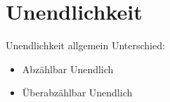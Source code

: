 
\section{Unendlichkeit}


%






\begin{frame}[c]{Unendlichkeit allgemein}
    \Large
    Unterschied:
    \pause
    \begin{itemize}
        \item Abzählbar Unendlich 
            \pause
        \item Überabzählbar Unendlich 
    \end{itemize}
\end{frame}



